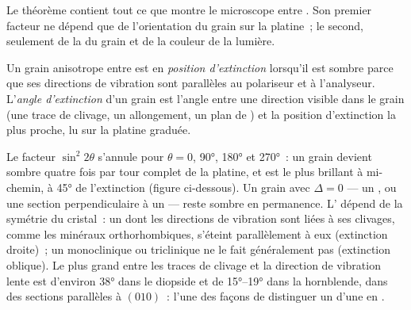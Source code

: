 Le théorème contient tout ce que montre le microscope entre .
Son premier facteur ne dépend que de l'orientation du grain sur la platine~; le
second, seulement de la  du grain et de la couleur de la
lumière.

\begin{definition}\label{def:b1:optical-mineralogy:extinction}
Un grain anisotrope entre  est en \emph{position
d'extinction} lorsqu'il est sombre parce que ses directions de vibration sont
parallèles au polariseur et à l'analyseur. L'\emph{angle d'extinction} d'un
grain est l'angle entre une direction visible dans le grain (une trace de
clivage, un allongement, un plan de ) et la position d'extinction la plus
proche, lu sur la platine graduée.
\end{definition}

Le facteur $\sin^2 2\theta$ s'annule pour $\theta = 0$, \ang{90}, \ang{180} et
\ang{270}~: un grain devient sombre quatre fois par tour complet de la platine, et
est le plus brillant à mi-chemin, à \ang{45} de l'extinction (figure ci-dessous).
Un grain avec
$\Delta = 0$ --- un , ou une section perpendiculaire à un  --- reste sombre en permanence. L' dépend de la symétrie
du cristal~: un  dont les directions de vibration sont liées à ses
clivages, comme les minéraux orthorhombiques, s'éteint parallèlement à eux
(extinction droite)~; un  monoclinique ou triclinique ne le fait
généralement pas (extinction oblique). Le plus grand  entre les
traces de clivage et la direction de vibration lente est d'environ \ang{38} dans
le diopside et de \ang{15}--\ang{19} dans la hornblende, dans des sections
parallèles à $(010)$~: l'une des façons de distinguer un  d'une 
en .

